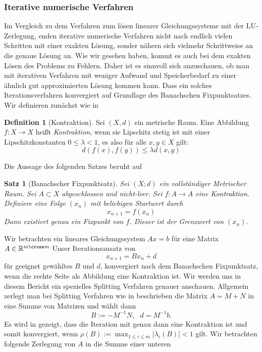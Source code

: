 \documentclass[smallheadings]{scrartcl}
\newtheorem{theorem}{Satz}
\theoremstyle{definition}
\newtheorem{definition}{Definition}[section]
\begin{document}
		\subsubsection{Iterative numerische Verfahren}
			Im Vergleich zu dem Verfahren zum lösen linearer Gleichungssysteme 
			mit der LU-Zerlegung,  enden iterative numerische Verfahren nicht nach
			endlich vielen Schritten mit einer exakten Lösung, sonder nähern sich vielmehr 
			Schrittweise an die genaue Lösung an.  Wie wir gesehen haben, kommt es 
			auch bei dem exakten Lösen des Problems zu Fehlern.  Daher ist es sinnvoll
			sich anzuschauen, ob man mit iterativen Verfahren mit weniger Aufwand
			und Speicherbedarf zu einer ähnlich gut approximierten Lösung
			kommen kann.  Dass ein solches Iterationsverfahren konvergiert auf
			Grundlage des Banachschen Fixpunktsatzes.
			Wir definieren zunächst wie in \citep{kont}
			\begin{definition}[Kontraktion]
			Sei $(X,d)$ ein metrische Raum.  Eine Abbildung $f:X\rightarrow X$ heißt 
			\textit{Kontraktion}, wenn sie Lipschitz stetig ist mit einer Lipschitzkonstanten
			$0\leq \lambda < 1$,  es also für alle $x,y\in X$ gilt:
			$$d(f(x),f(y))\leq \lambda d(x,y)$$
			\end{definition}
			Die Aussage des folgenden Satzes beruht auf \citep{ban}
			\begin{theorem}[Banachscher Fixpunktsatz]
			Sei $(X; d)$ ein vollständiger Metrischer Raum.  Sei $A\subset X$ 
			abgeschlossen und nicht-leer. Sei $f:A\rightarrow A$ eine Kontraktion. Definiere
			eine Folge $(x_n)$ mit beliebigen Startwert durch 
			$$x_{n+1}=f(x_n)$$
			Dann existiert genau ein Fixpunkt von $f$.  Dieser ist der Grenzwert von 
			$(x_n)$.
			\end{theorem}
			Wir betrachten ein lineares Gleichungssystem $Ax=b$ für eine Matrix
			$A\in \mathbb{R}^{m\cross m}$ Unser Iterationsansatz von \citep{skript}
			 $$x_{n+1}=Bx_n+d$$
			 für geeignet gewähltes $B$ und $d$,  konvergiert nach dem Banachschen 
			 Fixpunktsatz, wenn die rechte Seite als Abbildung eine 
			 Kontraktion ist. 
			Wir werden uns in diesem Bericht ein spezielles Splitting Verfahren genauer
			anschauen.  Allgemein zerlegt man bei Splitting Verfahren wie in \citep{skript}
			beschrieben die Matrix $A=M+N$ in eine Summe von Matrizen und wählt dann
			$$B:=-M^{-1}N,  \text{ } d=M^{-1}b.$$
			Es wird in \citep{skript} gezeigt, dass die Iteration mit genau dann eine
			Kontraktion ist und somit konvergiert, wenn 
			$\rho (B):=\max_{1\leq i \leq m} |\lambda _i(B)|<1$ gilt.
			Wir betrachten folgende Zerlegung von $A$ in die Summe einer unteren
\end{document}
